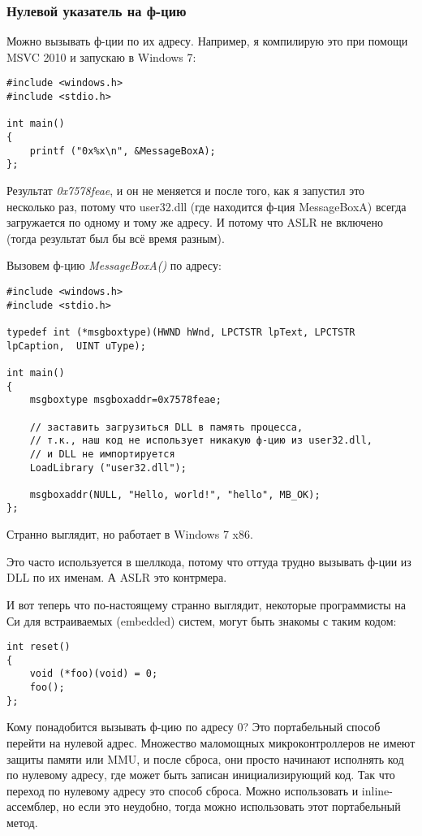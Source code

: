 \subsubsection{Нулевой указатель на ф-цию}

Можно вызывать ф-ции по их адресу.
Например, я компилирую это при помощи MSVC 2010 и запускаю в Windows 7:

\begin{lstlisting}[style=customc]
#include <windows.h>
#include <stdio.h>

int main()
{
	printf ("0x%x\n", &MessageBoxA);
};
\end{lstlisting}

Результат \emph{0x7578feae}, и он не меняется и после того, как я запустил это несколько раз, потому что
user32.dll (где находится ф-ция MessageBoxA) всегда загружается по одному и тому же адресу.
И потому что \ac{ASLR} не включено (тогда результат был бы всё время разным).

Вызовем ф-цию \emph{MessageBoxA()} по адресу:

\begin{lstlisting}[style=customc]
#include <windows.h>
#include <stdio.h>

typedef int (*msgboxtype)(HWND hWnd, LPCTSTR lpText, LPCTSTR lpCaption,  UINT uType);

int main()
{
	msgboxtype msgboxaddr=0x7578feae;

	// заставить загрузиться DLL в память процесса,
	// т.к., наш код не использует никакую ф-цию из user32.dll, 
	// и DLL не импортируется
	LoadLibrary ("user32.dll");

	msgboxaddr(NULL, "Hello, world!", "hello", MB_OK);
};
\end{lstlisting}

Странно выглядит, но работает в Windows 7 x86.

Это часто используется в шеллкода, потому что оттуда трудно вызывать ф-ции из DLL по их именам.
А \ac{ASLR} это контрмера.

И вот теперь что по-настоящему странно выглядит, некоторые программисты на Си для встраиваемых (embedded) систем, могут быть
знакомы с таким кодом:

\begin{lstlisting}[style=customc]
int reset()
{
	void (*foo)(void) = 0;
	foo();
};
\end{lstlisting}

Кому понадобится вызывать ф-цию по адресу 0?
Это портабельный способ перейти на нулевой адрес.
Множество маломощных микроконтроллеров не имеют защиты памяти или \ac{MMU}, и после сброса, они просто начинают
исполнять код по нулевому адресу, где может быть записан инициализирующий код.
Так что переход по нулевому адресу это способ сброса.
Можно использовать и inline-ассемблер, но если это неудобно, тогда можно использовать этот портабельный метод.

